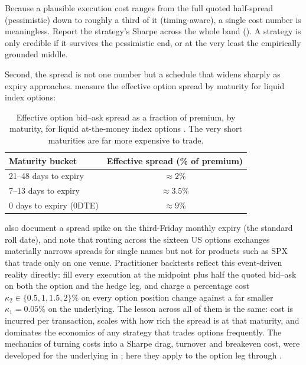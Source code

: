 \begin{warning}
Because a plausible execution cost ranges from the full quoted half-spread (pessimistic) down to roughly a third of it (timing-aware), a single cost number is meaningless. Report the strategy's Sharpe across the whole band (). A strategy is only credible if it survives the pessimistic end, or at the very least the empirically grounded middle.
\end{warning}

Second, the spread is not one number but a schedule that widens sharply as expiry approaches. \citet{DoshiPariShamsuddin2025} measure the effective option spread by maturity for liquid index options:

\begin{table}[ht]
\centering
\caption{Effective option bid--ask spread as a fraction of premium, by maturity, for liquid at-the-money index options \citep{DoshiPariShamsuddin2025}. The very short maturities are far more expensive to trade.}
\label{tab:ivrv:cost-schedule}
\begin{tabular}{lc}
\toprule
Maturity bucket & Effective spread (\% of premium) \\
\midrule
21--48 days to expiry & $\approx 2\%$ \\
7--13 days to expiry  & $\approx 3.5\%$ \\
0 days to expiry (0DTE) & $\approx 9\%$ \\
\bottomrule
\end{tabular}
\end{table}

\citet{DoshiPariShamsuddin2025} also document a spread spike on the third-Friday monthly expiry (the standard roll date), and note that routing across the sixteen US options exchanges materially narrows spreads for single names but not for products such as SPX that trade only on one venue. Practitioner backtests reflect this event-driven reality directly: \citet{WysockiSlepaczuk2024} fill every execution at the midpoint plus half the quoted bid--ask on both the option and the hedge leg, and \citet{FrancoisEtAl2025} charge a percentage cost $\kappa_2 \in \{0.5, 1, 1.5, 2\}\%$ on every option position change against a far smaller $\kappa_1 = 0.05\%$ on the underlying. The lesson across all of them is the same: cost is incurred per transaction, scales with how rich the spread is at that maturity, and dominates the economics of any strategy that trades options frequently. The mechanics of turning costs into a Sharpe drag, turnover and breakeven cost, were developed for the underlying in ; here they apply to the option leg through .

